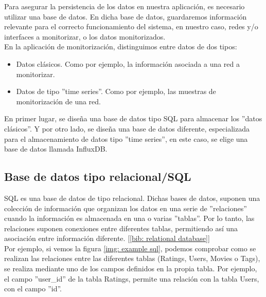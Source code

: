 \documentclass[a4paper, oneside, 12pt]{book}
\begin{document}
	\noindent Para asegurar la persistencia de los datos en nuestra aplicación, es necesario utilizar una base de datos. En dicha base de datos, guardaremos información relevante para el correcto funcionamiento del sistema, en nuestro caso, redes y/o interfaces a monitorizar, o los datos monitorizados. \\
	
	\noindent En la aplicación de monitorización, distinguimos entre datos de dos tipos:
	
	\begin{itemize}
		\item Datos clásicos. Como por ejemplo, la información asociada a una red a monitorizar.
		\item Datos de tipo ''time series''. Como por ejemplo, las muestras de monitorización de una red.
	\end{itemize}

	\noindent En primer lugar, se diseña una base de datos tipo SQL para almacenar los ''datos clásicos''. Y por otro lado, se diseña una base de datos diferente, especializada para el almacenamiento de datos tipo ''time series'', en este caso, se elige una base de datos llamada InfluxDB.
	
	\subsection{Base de datos tipo relacional/SQL}
	
	\noindent SQL es una base de datos de tipo relacional. Dichas bases de datos, suponen una colección de información que organizan los datos en una serie de ''relaciones'' cuando la información es almacenada en una o varias ''tablas''. Por lo tanto, las relaciones suponen conexiones entre diferentes tablas, permitiendo así una asociación entre información diferente. [\ref{bib: relational database}] \\
	
	\noindent Por ejemplo, si vemos la figura \ref{img: example sql}, podemos comprobar como se realizan las relaciones entre las diferentes tablas (Ratings, Users, Movies o Tags), se realiza mediante uno de los campos definidos en la propia tabla. Por ejemplo, el campo ''user\_id'' de la tabla Ratings, permite una relación con la tabla Users, con el campo ''id''.
	
\end{document}
